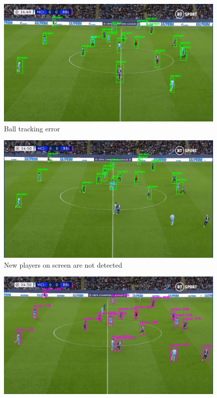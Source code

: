 \documentclass[
    11pt,
    oneside
]{report}
\begin{document}
\begin{appendices}
\begin{figure}[H]
    \label{img:2}
\end{figure}
\begin{figure}[H]
    \includegraphics[keepaspectratio, width=\columnwidth]{Screenshot_2022-03-03_21-35-39.png}
    \caption{Ball tracking error}
    \label{img:3}
\end{figure}
\begin{figure}[H]
    \includegraphics[keepaspectratio, width=\columnwidth]{Screenshot_2022-03-03_21-36-05.png}
    \caption{New players on screen are not detected}
    \label{img:4}
\end{figure}
\begin{figure}[H]
    \includegraphics[keepaspectratio, width=\columnwidth]{Screenshot_2022-03-03_21-38-04.png}

\end{figure}
\end{appendices}
\end{document}
